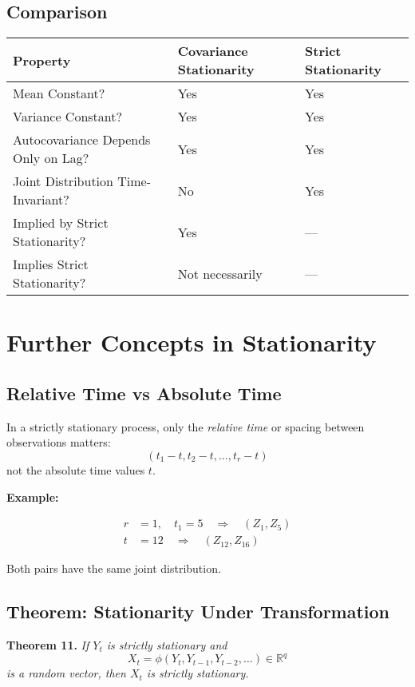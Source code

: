 \documentclass[12pt, oneside]{article}
\begin{document}
\subsection*{Comparison}

\begin{tabular}{|l|l|l|}
\hline
\textbf{Property} & \textbf{Covariance Stationarity} & \textbf{Strict Stationarity} \\
\hline
Mean Constant? & Yes & Yes \\
Variance Constant? & Yes & Yes \\
Autocovariance Depends Only on Lag? & Yes & Yes \\
Joint Distribution Time-Invariant? & No & Yes \\
Implied by Strict Stationarity? & Yes & --- \\
Implies Strict Stationarity? & Not necessarily & --- \\
\hline
\end{tabular}

\section*{Further Concepts in Stationarity}

\subsection*{Relative Time vs Absolute Time}

In a strictly stationary process, only the \textit{relative time} or spacing between observations matters:
\[
(t_1 - t, t_2 - t, \dots, t_r - t)
\]
not the absolute time values \( t \).

\textbf{Example:}

\begin{align*}
r &= 1, \quad t_1 = 5 \quad \Rightarrow \quad (Z_1, Z_5) \\
t &= 12 \quad \Rightarrow \quad (Z_{12}, Z_{16})
\end{align*}

Both pairs have the same joint distribution.

\subsection*{Theorem: Stationarity Under Transformation}

\textbf{Theorem 11.} \textit{If \( Y_t \) is strictly stationary and}
\[
X_t = \phi(Y_t, Y_{t-1}, Y_{t-2}, \dots) \in \mathbb{R}^q
\]
\textit{is a random vector, then \( X_t \) is strictly stationary.}
\end{document}
